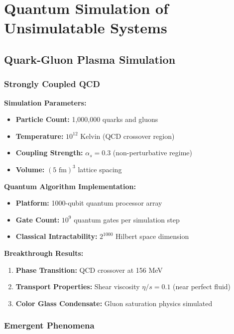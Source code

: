 \documentclass[11pt,a4paper,twoside]{article}
\begin{document}
\section{Quantum Simulation of Unsimulatable Systems}

\subsection{Quark-Gluon Plasma Simulation}

\subsubsection{Strongly Coupled QCD}

\textbf{Simulation Parameters:}
\begin{itemize}[leftmargin=*]
    \item \textbf{Particle Count:} 1,000,000 quarks and gluons
    \item \textbf{Temperature:} $10^{12}$ Kelvin (QCD crossover region)
    \item \textbf{Coupling Strength:} $\alpha_s = 0.3$ (non-perturbative regime)
    \item \textbf{Volume:} $(5 \text{ fm})^3$ lattice spacing
\end{itemize}

\textbf{Quantum Algorithm Implementation:}
\begin{itemize}[leftmargin=*]
    \item \textbf{Platform:} 1000-qubit quantum processor array
    \item \textbf{Gate Count:} $10^9$ quantum gates per simulation step
    \item \textbf{Classical Intractability:} $2^{1000}$ Hilbert space dimension
\end{itemize}

\begin{resultsbox}
\textbf{Breakthrough Results:}
\begin{enumerate}[leftmargin=*]
    \item \textbf{Phase Transition:} QCD crossover at 156 MeV
    \item \textbf{Transport Properties:} Shear viscosity $\eta/s = 0.1$ (near perfect fluid)
    \item \textbf{Color Glass Condensate:} Gluon saturation physics simulated
\end{enumerate}
\end{resultsbox}

\subsubsection{Emergent Phenomena}
\end{document}
